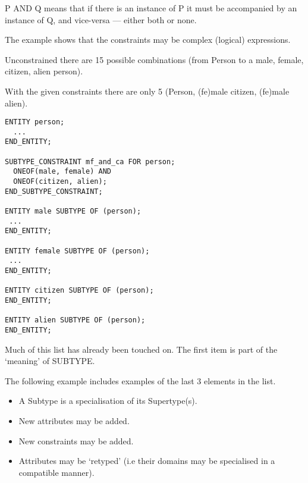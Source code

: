 \begin{remarks}
\remintro


P AND Q means that if there is an instance of P it must be accompanied
by an instance of Q, and vice-versa --- either both or none.

The example shows that the constraints may be complex (logical) expressions.

Unconstrained there are 15 possible combinations 
(from Person to a male, female, citizen, alien person).

With the given constraints there are only 5 
(Person, (fe)male citizen, (fe)male alien).


\remend
\end{remarks}


\begin{verbatim}
ENTITY person;
  ...
END_ENTITY;

SUBTYPE_CONSTRAINT mf_and_ca FOR person;
  ONEOF(male, female) AND
  ONEOF(citizen, alien);
END_SUBTYPE_CONSTRAINT;

ENTITY male SUBTYPE OF (person);
 ...
END_ENTITY;

ENTITY female SUBTYPE OF (person);
 ...
END_ENTITY;

ENTITY citizen SUBTYPE OF (person);
END_ENTITY;

ENTITY alien SUBTYPE OF (person);
END_ENTITY;
\end{verbatim}

\begin{remarks}
\remintro


Much of this list has already been touched on. The first
item is part of the `meaning' of SUBTYPE. 

The following
example includes examples of the last 3 elements in the list.

\remend
\end{remarks}


\begin{itemize}
\item A Subtype is a specialisation of its Supertype(s).
\item New attributes may be added.
\item New constraints may be added.
\item Attributes may be `retyped' (i.e their domains may be specialised in a
      compatible manner).
\end{itemize}

